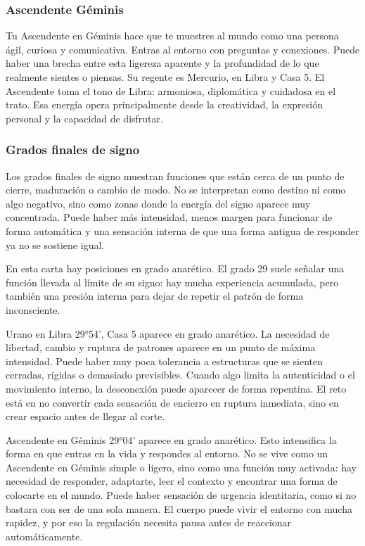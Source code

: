 \documentclass[11pt,a4paper]{article}\usepackage[utf8]{inputenc}
\begin{document}
\subsubsection*{Ascendente Géminis}
Tu Ascendente en Géminis hace que te muestres al mundo como una persona ágil, curiosa y comunicativa. Entras al entorno con preguntas y conexiones. Puede haber una brecha entre esta ligereza aparente y la profundidad de lo que realmente sientes o piensas. Su regente es Mercurio, en Libra y Casa 5. El Ascendente toma el tono de Libra: armoniosa, diplomática y cuidadosa en el trato. Esa energía opera principalmente desde la creatividad, la expresión personal y la capacidad de disfrutar.

\subsubsection*{Grados finales de signo}
Los grados finales de signo muestran funciones que están cerca de un punto de cierre, maduración o cambio de modo. No se interpretan como destino ni como algo negativo, sino como zonas donde la energía del signo aparece muy concentrada. Puede haber más intensidad, menos margen para funcionar de forma automática y una sensación interna de que una forma antigua de responder ya no se sostiene igual.

En esta carta hay posiciones en grado anarético. El grado 29 suele señalar una función llevada al límite de su signo: hay mucha experiencia acumulada, pero también una presión interna para dejar de repetir el patrón de forma inconsciente.

Urano en Libra 29°54', Casa 5 aparece en grado anarético. La necesidad de libertad, cambio y ruptura de patrones aparece en un punto de máxima intensidad. Puede haber muy poca tolerancia a estructuras que se sienten cerradas, rígidas o demasiado previsibles. Cuando algo limita la autenticidad o el movimiento interno, la desconexión puede aparecer de forma repentina. El reto está en no convertir cada sensación de encierro en ruptura inmediata, sino en crear espacio antes de llegar al corte.

Ascendente en Géminis 29°04' aparece en grado anarético. Esto intensifica la forma en que entras en la vida y respondes al entorno. No se vive como un Ascendente en Géminis simple o ligero, sino como una función muy activada: hay necesidad de responder, adaptarte, leer el contexto y encontrar una forma de colocarte en el mundo. Puede haber sensación de urgencia identitaria, como si no bastara con ser de una sola manera. El cuerpo puede vivir el entorno con mucha rapidez, y por eso la regulación necesita pausa antes de reaccionar automáticamente.
\end{document}
